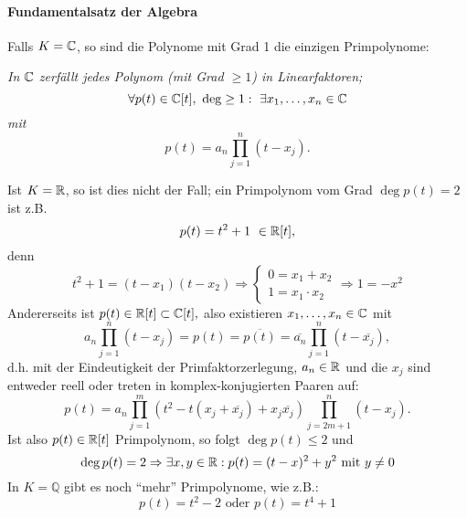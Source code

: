 \paragraph{Fundamentalsatz der Algebra}
	Falls $ K = \mathbb{C} $, so sind die Polynome mit Grad 1 die einzigen Primpolynome:
		\begin{Satz}
		\begin{addmargin}{1cm}
			\textit{In $ \mathbb{C} $ zerfällt jedes Polynom (mit Grad $ \geq 1 $) in Linearfaktoren;
				\[ \forall p(t)\in \C[t],\ \deg \geq 1:\ \exists x_1,\dots,x_n \in \C \]
			mit
				\[ p(t) = a_n \prod_{j=1}^{n}(t-x_j). \]}
		\end{addmargin}
		\end{Satz}
	Ist $ K=\mathbb{R} $, so ist dies nicht der Fall; ein Primpolynom vom Grad $ \deg p(t) = 2 $ ist z.B.
		\[ p(t) = t^2+1\ \in \mathbb{R}[t], \]
	denn
		\[ t^2+1 = (t-x_1)(t-x_2) \Rightarrow
			\begin{cases}
				0 = x_1 + x_2\\
				1 = x_1 \cdot x_2
			\end{cases}
		\Rightarrow 1 = -x^2 \]
	Andererseits ist $ p(t)\in \mathbb{R}[t]\subset \mathbb{C}[t], $
	also existieren $ x_1,\dots,x_n\in \mathbb{C} $ mit
		\[ a_n\prod_{j=1}^{n}(t-x_j) = p(t) = \overline{p(t)} = \overline{a_n}\prod_{j=1}^{n}(t-\overline{x_j}), \]
	d.h. mit der Eindeutigkeit der Primfaktorzerlegung, $ a_n\in \mathbb{R} $ und die $ x_j $ sind entweder reell oder treten in komplex-konjugierten Paaren auf:
		\[ p(t) = a_n\prod_{j=1}^{m}(t^2-t(x_j+\overline{x_j})+x_j\overline{x_j})\prod_{j=2m+1}^{n}(t-x_j). \]
	Ist also $ p(t) \in \mathbb{R}[t] $ Primpolynom, so folgt $ \deg p(t)\leq 2 $ und
		\[ \deg p(t) = 2 \Rightarrow \exists x,y\in \mathbb{R}: p(t) = (t-x)^2+y^2 \text{ mit } y\neq 0\]
	In $ K=\mathbb{Q} $ gibt es noch "`mehr"' Primpolynome, wie z.B.:
		\[ p(t) = t^2-2 \text{ oder } p(t) = t^4+1 \]
